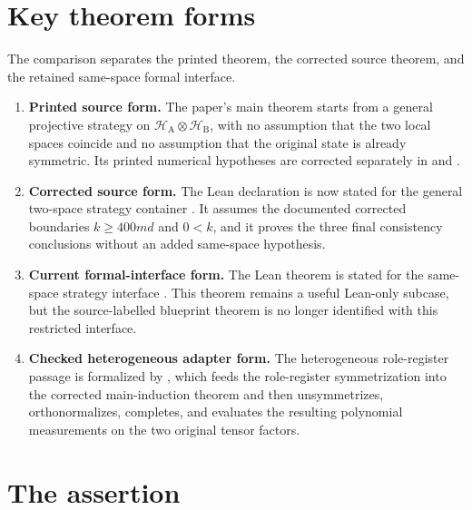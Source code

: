 \documentclass{article}
\begin{document}
\section{Key theorem forms}

The comparison separates the printed theorem, the corrected source theorem, and
the retained same-space formal interface.
\begin{enumerate}
  \item \textbf{Printed source form.}  The paper's main theorem starts from a
  general projective strategy on
  \(\mathcal H_{\mathrm A}\otimes\mathcal H_{\mathrm B}\), with no assumption
  that the two local spaces coincide and no assumption that the original state is
  already symmetric.  Its printed numerical hypotheses are corrected separately
  in  and
  .
  \item \textbf{Corrected source form.}  The Lean declaration
   is now stated for the
  general two-space strategy container
  .  It assumes the documented corrected
  boundaries \(k\ge 400md\) and \(0<k\), and it proves the three final
  consistency conclusions without an added same-space hypothesis.
  \item \textbf{Current formal-interface form.}  The Lean theorem
   is stated for the same-space strategy
  interface .  This theorem remains a
  useful Lean-only subcase, but the source-labelled blueprint theorem is no
  longer identified with this restricted interface.
  \item \textbf{Checked heterogeneous adapter form.}  The heterogeneous
  role-register passage is formalized by
  ,
  which feeds the role-register symmetrization into the corrected
  main-induction theorem and then unsymmetrizes, orthonormalizes, completes, and
  evaluates the resulting polynomial measurements on the two original tensor
  factors.
\end{enumerate}

\section{The assertion}
\end{document}
